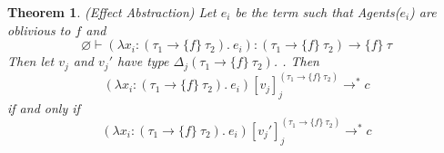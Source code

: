 \documentclass{article}
\newtheorem{theorem}{Theorem}[section]
\begin{document}
\begin{theorem} (Effect Abstraction)
Let $e_i$ be the term such that Agents($e_i$) are oblivious to $f$ and $$\varnothing \vdash (\lambda x_i : (\tau_1 \rightarrow \{f\}\ \tau_2).\ e_i) : (\tau_1 \rightarrow \{f\}\ \tau_2) \rightarrow \{f\}\ \tau$$ Then let $v_j$ and $v_j'$ have  type $\Delta_j(\tau_1 \rightarrow \{f\}\ \tau_2)$. . Then$$(\lambda x_i : (\tau_1 \rightarrow \{f\}\ \tau_2).\ e_i )[v_j]^{(\tau_1 \rightarrow \{f\}\ \tau_2)}_j \longrightarrow^* c$$ if and only if
$$(\lambda x_i : (\tau_1 \rightarrow \{f\}\ \tau_2).\ e_i )[v_j']^{(\tau_1 \rightarrow \{f\}\ \tau_2)}_j \longrightarrow^* c$$ 

\end{theorem}
\end{document}
